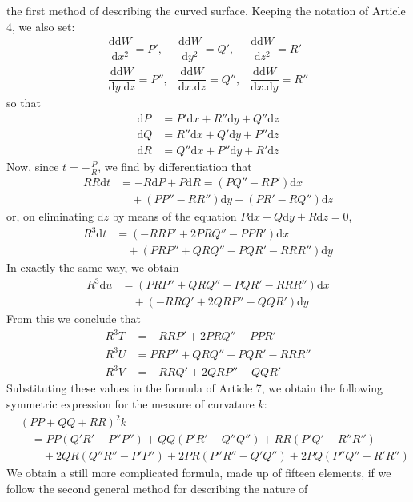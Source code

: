 %
the first method of describing the curved surface. Keeping the notation of Article 4, we also set:
\[
\begin{array}{lll}
\dfrac{\mathrm{d}\mathrm{d}W}{\mathrm{d}x^2}=P',&\dfrac{\mathrm{d}\mathrm{d}W}{\mathrm{d}y^2}=Q',&\dfrac{\mathrm{d}\mathrm{d}W}{\mathrm{d}z^2}=R'\\[6pt]
\dfrac{\mathrm{d}\mathrm{d}W}{\mathrm{d}y\mathord{.}\mathrm{d}z}=P'',&\dfrac{\mathrm{d}\mathrm{d}W}{\mathrm{d}x\mathord{.}\mathrm{d}z}=Q'',&\dfrac{\mathrm{d}\mathrm{d}W}{\mathrm{d}x\mathord{.}\mathrm{d}y}=R''
\end{array}
\]
so that
\[
\begin{aligned}
\mathrm{d}P&=P'\mathrm{d}x+R''\mathrm{d}y+Q''\mathrm{d}z\\
\mathrm{d}Q&=R''\mathrm{d}x+Q'\mathrm{d}y+P''\mathrm{d}z\\
\mathrm{d}R&=Q''\mathrm{d}x+P''\mathrm{d}y+R'\mathrm{d}z
\end{aligned}
\]
Now, since \(t=-\frac{P}{R}\), we find by differentiation that
\[
\begin{aligned}
RR\mathrm{d}t&=-R\mathrm{d}P+P\mathrm{d}R=(PQ''-RP')\mathrm{d}x\\
&\quad +(PP''-RR'')\mathrm{d}y+(PR'-RQ'')\mathrm{d}z
\end{aligned}
\]
or, on eliminating \(\mathrm{d}z\) by means of the equation \(P\mathrm{d}x+Q\mathrm{d}y+R\mathrm{d}z=0\),
\[
\begin{aligned}
R^3\mathrm{d}t&=(-RRP'+2PRQ''-PPR')\mathrm{d}x\\
&\quad +(PRP''+QRQ''-PQR'-RRR'')\mathrm{d}y
\end{aligned}
\]
In exactly the same way, we obtain
\[
\begin{aligned}
R^3\mathrm{d}u&=(PRP''+QRQ''-PQR'-RRR'')\mathrm{d}x\\
&\quad +(-RRQ'+2QRP''-QQR')\mathrm{d}y
\end{aligned}
\]
From this we conclude that
\[
\begin{aligned}
R^3T&=-RRP'+2PRQ''-PPR'\\
R^3U&=PRP''+QRQ''-PQR'-RRR''\\
R^3V&=-RRQ'+2QRP''-QQR'
\end{aligned}
\]
Substituting these values in the formula of Article 7, we obtain the following symmetric expression for the measure of curvature \(k\):
\[
\begin{aligned}
&(PP+QQ+RR)^2k\\
&\quad=PP(Q'R'-P''P'')+QQ(P'R'-Q''Q'')+RR(P'Q'-R''R'')\\
&\qquad+2QR(Q''R''-P'P'')+2PR(P''R''-Q'Q'')+2PQ(P''Q''-R'R'')
\end{aligned}
\]
We obtain a still more complicated formula, made up of fifteen elements, if we follow the second general method for describing the nature of

